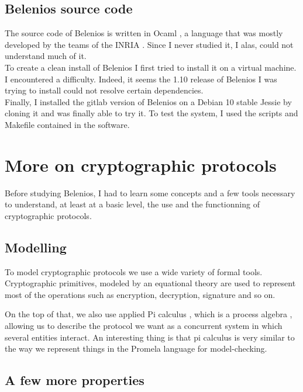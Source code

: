 \documentclass[12pt, a4paper]{report}
\begin{document}
\subsection{Belenios source code}

The source code of Belenios is written in Ocaml \cite{WEBSITE:7}, a language that was mostly developed by the teams of the INRIA \cite{WEBSITE:8}. Since I never studied it, I alas, could not understand much of it.\\ 

To create a clean install of Belenios I first tried to install it on a virtual machine. I encountered a difficulty. Indeed, it seems the 1.10 release of Belenios I was trying to install could not resolve certain dependencies.\\

Finally, I installed the gitlab version of Belenios on a Debian 10 stable Jessie by cloning it and was finally able to try it. To test the system, I used the scripts and Makefile contained in the software.

\section{More on cryptographic protocols}

Before studying Belenios, I had to learn some concepts and a few tools necessary to understand, at least at a basic level, the use and the functionning of cryptographic protocols. \cite{WEBSITE:9} 

\subsection{Modelling}

To model cryptographic protocols we use a wide variety of formal tools.
Cryptographic primitives, modeled by an equational theory \cite{WEBSITE:9} are used to represent most of the operations such as encryption, decryption, signature and so on.

On the top of that, we also use applied Pi calculus \cite{WEBSITE:9} \cite{WEBSITE:10}, which is a process algebra \cite{WEBSITE:9}, allowing us to describe the protocol we want as a concurrent system in which several entities interact. An interesting thing is that pi calculus is very similar to the way we represent things in the Promela language for model-checking. 

\subsection{A few more properties}
\end{document}
